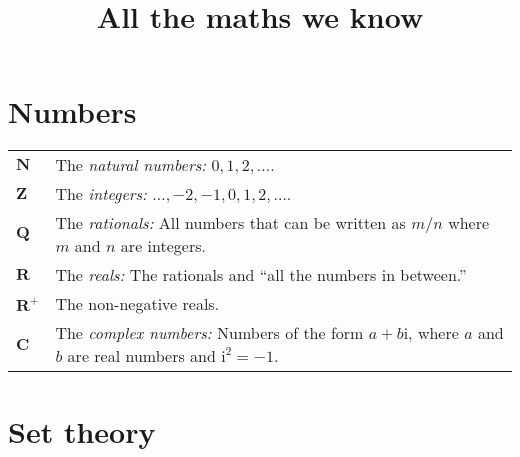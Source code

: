 \documentclass[10pt, a4paper, twocolumn]{article}
\title{All the maths we know}
\date{}
\author{}
\newcommand{\set}[1]{\mathbold{#1}}
\newcommand{\imag}{\mathrm{i}}
\begin{document}
\maketitle
\section*{Numbers}
\begin{tabularx}{\columnwidth}{@{}p{}>{\raggedright\arraybackslash}X@{}}
  \toprule
  $\set{N}$ & The \emph{natural numbers:} $0, 1, 2, \dotsc$. \\
  $\set{Z}$ & The \emph{integers:} $\dotsc, -2, -1, 0, 1, 2, \dotsc$. \\
  $\set{Q}$ & The \emph{rationals:} All numbers that can be written
  as $m/n$ where $m$ and $n$ are integers. \\
  $\set{R}$ & The \emph{reals:} The rationals and ``all the numbers in
  between.'' \\
  $\set{R}^+$ & The non-negative reals. \\
  $\set{C}$ & The \emph{complex numbers:} Numbers of the form $a + b\imag$, where $a$ and $b$ are real numbers and $\imag^2=-1$. 
\end{tabularx}

\section*{Set theory}
\end{document}

